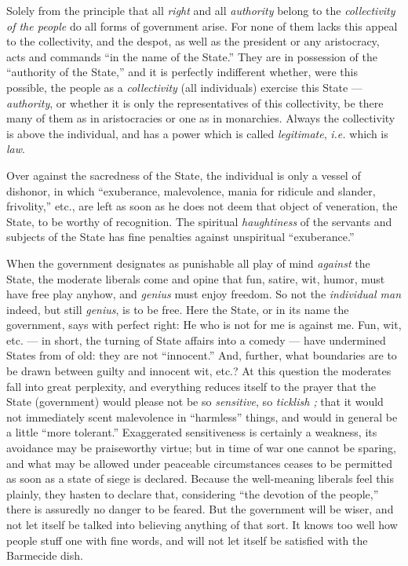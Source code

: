 Solely from the principle that all \textit{right} and all \textit{authority} 
belong to the \textit{collectivity of the people} do all forms of government 
arise. For none of them lacks this appeal to the collectivity, and the despot, 
as well as the president or any aristocracy, acts and commands ``in the name 
of the State.'' They are in possession of the ``authority of the State,'' 
and it is perfectly indifferent whether, were this possible, the people as a 
\textit{collectivity} (all individuals) exercise this State --- \textit{authority}, or whether it is only the representatives of this 
collectivity, be there many of them as in aristocracies or one as in 
monarchies. Always the collectivity is above the individual, and has a power 
which is called \textit{legitimate}, \textit{i.e.} which is \textit{law}.

Over against the sacredness of the State, the individual is only a vessel of 
dishonor, in which ``exuberance, malevolence, mania for ridicule and slander, 
frivolity,'' etc., are left as soon as he does not deem that object of 
veneration, the State, to be worthy of recognition. The spiritual 
\textit{haughtiness} of the servants and subjects of the State has fine 
penalties against unspiritual ``exuberance.''

When the government designates as punishable all play of mind \textit{against} 
the State, the moderate liberals come and opine that fun, satire, wit, humor, 
must have free play anyhow, and \textit{genius} must enjoy freedom. So not the 
\textit{individual man} indeed, but still \textit{genius}, is to be free. Here 
the State, or in its name the government, says with perfect right: He who is 
not for me is against me. Fun, wit, etc. --- in short, the turning of State 
affairs into a comedy --- have undermined States from of old: they are not 
``innocent.'' And, further, what boundaries are to be drawn between guilty 
and innocent wit, etc.? At this question the moderates fall into great 
perplexity, and everything reduces itself to the prayer that the State 
(government) would please not be so \textit{sensitive}, so \textit{ticklish ;} 
that it would not immediately scent malevolence in ``harmless'' things, and 
would in general be a little ``more tolerant.'' Exaggerated sensitiveness is 
certainly a weakness, its avoidance may be praiseworthy virtue; but in time of 
war one cannot be sparing, and what may be allowed under peaceable 
circumstances ceases to be permitted as soon as a state of siege is declared. 
Because the well-meaning liberals feel this plainly, they hasten to declare 
that, considering ``the devotion of the people,'' there is assuredly no 
danger to be feared. But the government will be wiser, and not let itself be 
talked into believing anything of that sort. It knows too well how people 
stuff one with fine words, and will not let itself be satisfied with the 
Barmecide dish.


